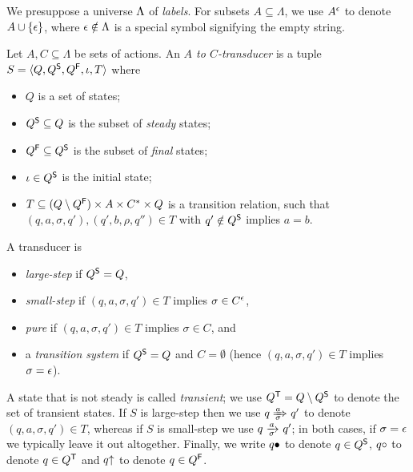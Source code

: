 \documentclass{llncs}
\begin{document}
We presuppose a universe $\Lambda$ of \emph{labels}. For subsets $A\subseteq \Lambda$, we use $A^\epsilon$ to denote $A\cup\{{\epsilon}\}$, where $\epsilon\notin\Lambda$ is a special symbol signifying the empty string.

\begin{definition}[transducer]
Let $A,C\subseteq \Lambda$ be sets of actions. An \emph{$A$ to $C$-transducer} is a tuple $S=\langle{Q,Q^{\mathsf{S}},Q^{\mathsf{F}},\iota,T}\rangle$ where
\begin{itemize}[topsep=\itemsep]
\item $Q$ is a set of states;
\item $Q^{\mathsf{S}}\subseteq Q$ is the subset of \emph{steady} states;
\item $Q^{\mathsf{F}}\subseteq Q^{\mathsf{S}}$ is the subset of \emph{final} states;
\item $\iota\in Q^{\mathsf{S}}$ is the initial state;
\item $T\subseteq (Q\setminus Q^{\mathsf{F}})\times A\times C^*\times Q$ is a transition relation, such that $(q,a,\sigma,q'),(q',b,\rho,q'')\in T$ with $q'\notin Q^{\mathsf{S}}$ implies $a=b$.
\end{itemize}
A transducer is
\begin{itemize}
\item \emph{large-step} if $Q^{\mathsf{S}}=Q$,
\item \emph{small-step} if $(q,a,\sigma,q')\in T$ implies $\sigma\in C^\epsilon$,
\item \emph{pure} if $(q,a,\sigma,q')\in T$ implies $\sigma\in C$, and 
\item a \emph{transition system} if $Q^{\mathsf{S}}=Q$ and $C=\emptyset$ (hence $(q,a,\sigma,q')\in T$ implies $\sigma=\epsilon$).
\end{itemize}
\end{definition}
%
A state that is not steady is called \emph{transient}; we use $Q^{\mathsf{T}}=Q\setminus Q^{\mathsf{S}}$ to denote the set of transient states. If $S$ is large-step then we use $q\Tduce a\sigma q'$ to denote $(q,a,\sigma,q')\in T$, whereas if $S$ is small-step we use $q\tduce a\sigma q'$; in both cases, if $\sigma=\epsilon$ we typically leave it out altogether. Finally, we write $q{\bullet}$ to denote $q\in Q^{\mathsf{S}}$, $q{\circ}$ to denote $q\in Q^{\mathsf{T}}$ and $q{\uparrow}$ to denote $q\in Q^{\mathsf{F}}$.
\end{document}
